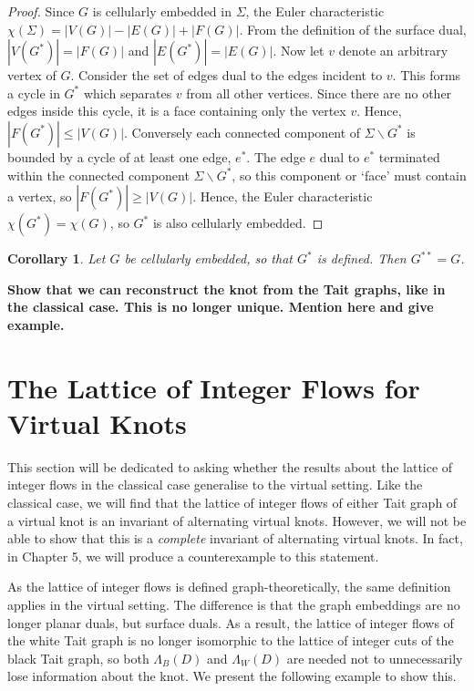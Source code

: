 \documentclass[12pt]{report}
\newcommand{\notered}[1]{{\color{Red} \textbf{#1}}}
\newtheorem*{corollary}{Corollary}
\theoremstyle{upright}
\begin{document}
\begin{proof}
Since $G$ is cellularly embedded in $\Sigma$, the Euler characteristic $\chi(\Sigma) = |V(G)| - |E(G)| + |F(G)|$. From the definition of the surface dual, $|V(G^{*})| = |F(G)|$ and $|E(G^{*})| = |E(G)|$. Now let $v$ denote an arbitrary vertex of $G$. Consider the set of edges dual to the edges incident to $v$. This forms a cycle in $G^{*}$ which separates $v$ from all other vertices. Since there are no other edges inside this cycle, it is a face containing only the vertex $v$. Hence, $|F(G^{*})| \leq |V(G)|$. Conversely each connected component of $\Sigma \smallsetminus G^{*}$ is bounded by a cycle of at least one edge, $e^{*}$. The edge $e$ dual to $e^{*}$ terminated within the connected component $\Sigma \smallsetminus G^{*}$, so this component or `face' must contain a vertex, so $|F(G^{*})| \geq |V(G)|$. Hence, the Euler characteristic $\chi(G^{*}) = \chi(G)$, so $G^{*}$ is also cellularly embedded.
\end{proof}

\begin{corollary}
Let $G$ be cellularly embedded, so that $G^{*}$ is defined. Then $G^{**} = G$.
\end{corollary}

\notered{Show that we can reconstruct the knot from the Tait graphs, like in the classical case. This is no longer unique. Mention here and give example.}

\section{The Lattice of Integer Flows for Virtual Knots}

This section will be dedicated to asking whether the results about the lattice of integer flows in the classical case generalise to the virtual setting. Like the classical case, we will find that the lattice of integer flows of either Tait graph of a virtual knot is an invariant of alternating virtual knots. However, we will not be able to show that this is a \textit{complete} invariant of alternating virtual knots. In fact, in Chapter 5, we will produce a counterexample to this statement.

As the lattice of integer flows is defined graph-theoretically, the same definition applies in the virtual setting. The difference is that the graph embeddings are no longer planar duals, but surface duals. As a result, the lattice of integer flows of the white Tait graph is no longer isomorphic to the lattice of integer cuts of the black Tait graph, so both $\Lambda_{B}(D)$ and $\Lambda_{W}(D)$ are needed not to unnecessarily lose information about the knot. We present the following example to show this.
\end{document}
